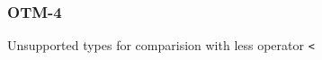 \subsubsection{OTM-4}\label{sec:error_code_otm_4}

Unsupported types for comparision with less operator \texttt{<}


